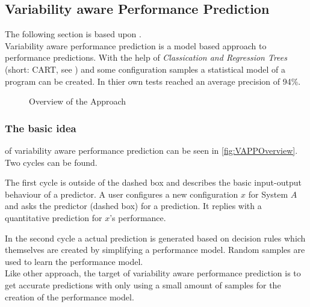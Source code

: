 \subsection{Variability aware Performance Prediction}\label{sec:vapp}

The following section is based upon \cite{VariabilityAwarePerformancePredictionJianmeiSigmundApel}.\\
Variability aware performance prediction is a model based approach to performance predictions. With the help of \textit{Classication and Regression Trees} (short: CART, see \cite{ClassificationandRegressionTrees}) and some configuration samples a statistical model of a program can be created. In thier own tests \citet{VariabilityAwarePerformancePredictionJianmeiSigmundApel} reached an average precision of 94\%.

\def\X{\ensuremath{\mathbf{X}}}
\def\Y{\ensuremath{\mathrm{Y}}}
\def\x{\ensuremath{\mathrm{\mathbf{x}}}}
\def\y{\ensuremath{\mathrm{y}}}

\begin{wrapfigure}{r}{.5\textwidth}
	\vspace{-1\baselineskip}
	\setlength\belowcaptionskip{-\baselineskip}
	
	\caption{Overview of the Approach \cite{VariabilityAwarePerformancePredictionJianmeiSigmundApel}}	
	\label{fig:VAPPOverview}
\end{wrapfigure}

\subsubsection[Basic Idea]{\textnormal{The} basic idea} of variability aware performance prediction can be seen in \autoref{fig:VAPPOverview}.
Two cycles can be found. 

The first cycle is outside of the dashed box and describes the basic input-output behaviour of a predictor. A user configures a new configuration $x$ for System $A$ and asks the predictor (dashed box) for a prediction. It replies with a quantitative prediction for $x$'s performance.

In the second cycle a actual prediction is generated based on decision rules which themselves are created by simplifying a performance model. Random samples are used to learn the performance model.\\
Like other approach, the target of variability aware performance prediction is to get accurate predictions with only using a small amount of samples for the creation of the performance model.


